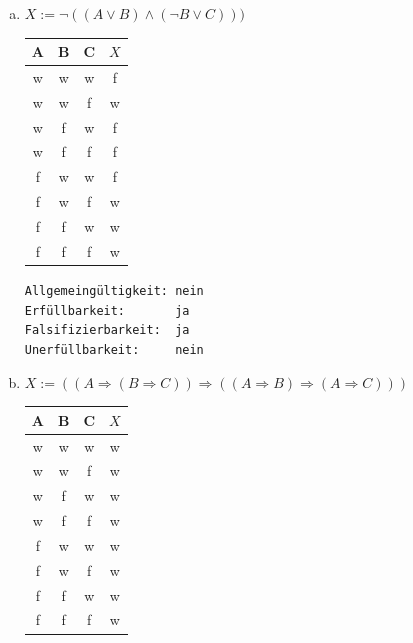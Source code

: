 \documentclass[10pt, oneside]{article}
\begin{document}
\begin{enumerate}[(a)]
    \item $X := \lnot((A \lor B) \land (\lnot B \lor C)))$

        \begin{table}[h]
            \hspace{23px}
            \begin{tabular}{|c|c|c|c|}
                \hline
                A & B & C & $X$ \\
                \hline
                w & w & w & f \\
                \hline
                w & w & f & w \\
                \hline
                w & f & w & f \\
                \hline
                w & f & f & f \\
                \hline
                f & w & w & f \\
                \hline
                f & w & f & w \\
                \hline
                f & f & w & w \\
                \hline
                f & f & f & w \\
                \hline
            \end{tabular}
        \end{table}

        \verb|Allgemeingültigkeit: nein| \\
        \verb|Erfüllbarkeit:       ja| \\
        \verb|Falsifizierbarkeit:  ja| \\
        \verb|Unerfüllbarkeit:     nein|

    \item $X := ((A \Rightarrow (B \Rightarrow C)) \Rightarrow ((A \Rightarrow B) \Rightarrow (A \Rightarrow C)))$

        \begin{table}[h]
            \hspace{22px}
            \begin{tabular}{|c|c|c|c|}
                \hline
                A & B & C & $X$ \\
                \hline
                w & w & w & w \\
                \hline
                w & w & f & w \\
                \hline
                w & f & w & w \\
                \hline
                w & f & f & w \\
                \hline
                f & w & w & w \\
                \hline
                f & w & f & w \\
                \hline
                f & f & w & w \\
                \hline
                f & f & f & w \\
                \hline
            \end{tabular}
        \end{table}


\end{enumerate}
\end{document}
